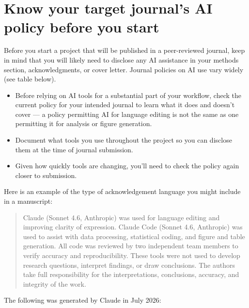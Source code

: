 \documentclass[
]{book}
\providecommand{\tightlist}{%
  \setlength{\itemsep}{0pt}\setlength{\parskip}{0pt}}
\begin{document}
\section{Know your target journal's AI policy before you start}\label{know-your-target-journals-ai-policy-before-you-start}

Before you start a project that will be published in a peer-reviewed
journal, keep in mind that you will likely need to disclose any AI
assistance in your methods section, acknowledgments, or cover letter.
Journal policies on AI use vary widely (see table below).

\begin{itemize}
\tightlist
\item
  Before relying on AI tools for a substantial part of your workflow,
  check the current policy for your intended journal to learn what it
  does and doesn't cover --- a policy permitting AI for language editing
  is not the same as one permitting it for analysis or figure
  generation.
\item
  Document what tools you use throughout the project so you can disclose
  them at the time of journal submission.
\item
  Given how quickly tools are changing, you'll need to check the policy
  again closer to submission.
\end{itemize}

Here is an example of the type of acknowledgement language you might
include in a manuscript:

\begin{quote}
Claude (Sonnet 4.6, Anthropic) was used for language editing and
improving clarity of expression. Claude Code (Sonnet 4.6, Anthropic)
was used to assist with data processing, statistical coding, and
figure and table generation. All code was reviewed by two independent
team members to verify accuracy and reproducibility. These tools were
not used to develop research questions, interpret findings, or draw
conclusions. The authors take full responsibility for the
interpretations, conclusions, accuracy, and integrity of the work.
\end{quote}

The following was generated by Claude in July 2026:
\end{document}
